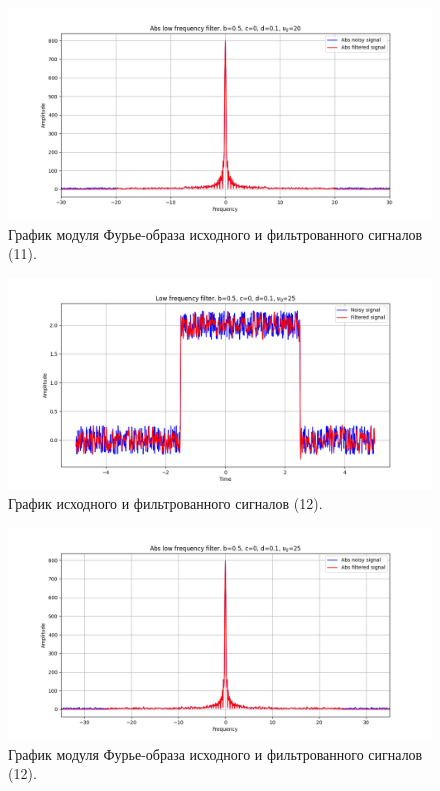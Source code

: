 \documentclass[a4paper, 12pt]{article}
\begin{document}
    \begin{figure}[!htb]
        \centering
        \includegraphics[scale=0.48]{6_abs_u_U_nohigh.png}
        \captionsetup{skip=0pt}
        \caption{График модуля Фурье-образа исходного и фильтрованного сигналов (11).}
        \label{fig:fig22}
    \end{figure}
    \begin{figure}[!htb]
        \centering
        \includegraphics[scale=0.48]{10_u_flt_u_nohigh.png}
        \captionsetup{skip=0pt}
        \caption{График исходного и фильтрованного сигналов (12).}
        \label{fig:fig23}
    \end{figure}
    \begin{figure}[!htb]
        \centering
        \includegraphics[scale=0.48]{10_abs_u_U_nohigh.png}
        \captionsetup{skip=0pt}
        \caption{График модуля Фурье-образа исходного и фильтрованного сигналов (12).}
        \label{fig:fig24}
    \end{figure}
\end{document}
